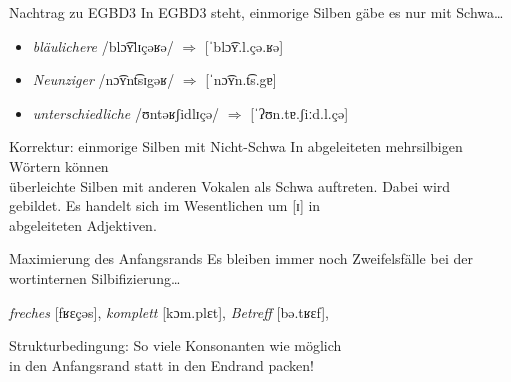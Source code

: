 \begin{frame}
  {Nachtrag zu EGBD3}
  \pause
  In EGBD3 steht, einmorige Silben gäbe es nur mit Schwa\ldots
  \pause
  \Zeile
  \begin{itemize}[<+->]
    \item \textit{bläulichere} /blɔ͡ʏlɪçəʁə/ $\Rightarrow$ [ˈblɔ͡ʏ.l.çə.ʁə]
    \item \textit{Neunziger} /nɔ͡ʏnt͡sɪgəʁ/ $\Rightarrow$ [ˈnɔ͡ʏn.t͡s.gɐ]
    \item \textit{unterschiedliche} /ʊntəʁʃidlɪçə/ $\Rightarrow$ [ˈʔʊn.tɐ.ʃiːd.l.çə]
  \end{itemize}
  \pause
  \Halbzeile
  \begin{alertblock}{Korrektur: einmorige Silben mit Nicht-Schwa}
    In abgeleiteten mehrsilbigen Wörtern können \\
    überleichte Silben mit anderen Vokalen als Schwa auftreten. Dabei wird \\
     gebildet. Es handelt sich im Wesentlichen um [ɪ] in\\
    abgeleiteten Adjektiven.
  \end{alertblock}
\end{frame}


\begin{frame}
  {Maximierung des Anfangsrands}
  \pause
  Es bleiben immer noch Zweifelsfälle bei der wortinternen Silbifizierung\dots\\
  \pause
  \Zeile
  \begin{exe}
    \ex\textit{freches} \alert{[fʁɛç̣əs]}, \rot{*[fʁɛç.əs]}
    \pause
    \ex\textit{komplett} \alert{[kɔm.plɛt]}, 
    \pause
    \ex\textit{Betreff} \alert{[bə.tʁɛf]}, 
  \end{exe}
  \Zeile
  \pause
  \Large
  Strukturbedingung: So viele Konsonanten wie möglich\\
  in den \alert{Anfangsrand} statt in den Endrand packen!\\
\end{frame}


